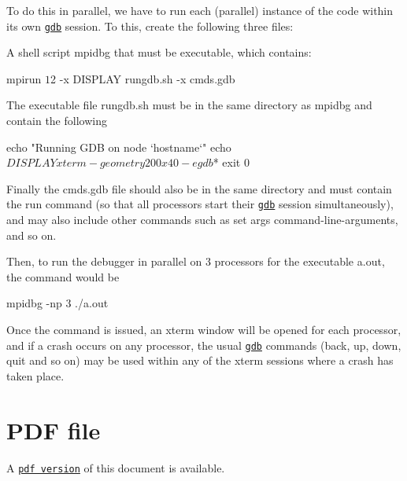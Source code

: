 To do this in parallel, we have to run each (parallel) instance of the code within its own \href{http://www.gnu.org/software/gdb/}{\tt gdb} session. To this, create the following three files\+:
\begin{DoxyItemize}
\item A shell script {\ttfamily mpidbg} that must be executable, which contains\+: 
\begin{DoxyCode}
mpirun $1 $2 -x DISPLAY rungdb.sh -x cmds.gdb
\end{DoxyCode}

\item The executable file {\ttfamily rungdb.\+sh} must be in the same directory as {\ttfamily mpidbg} and contain the following 
\begin{DoxyCode}
echo \textcolor{stringliteral}{"Running GDB on node `hostname`"}
echo $DISPLAY
xterm -geometry 200x40 -e gdb $*
exit 0
\end{DoxyCode}

\item Finally the {\ttfamily cmds.\+gdb} file should also be in the same directory and must contain the {\ttfamily run} command (so that all processors start their \href{http://www.gnu.org/software/gdb/}{\tt gdb} session simultaneously), and may also include other commands such as {\ttfamily set} {\ttfamily args} {\ttfamily command-\/line-\/arguments}, and so on.
\end{DoxyItemize}

Then, to run the debugger in parallel on 3 processors for the executable {\ttfamily a.\+out}, the command would be 
\begin{DoxyCode}
mpidbg -np 3 ./a.out 
\end{DoxyCode}
 Once the command is issued, an {\ttfamily xterm} window will be opened for each processor, and if a crash occurs on any processor, the usual \href{http://www.gnu.org/software/gdb/}{\tt gdb} commands ({\ttfamily back}, {\ttfamily up}, {\ttfamily down}, {\ttfamily quit} and so on) may be used within any of the {\ttfamily xterm} sessions where a crash has taken place.



 

 \hypertarget{index_pdf}{}\section{P\+D\+F file}\label{index_pdf}
A \href{../latex/refman.pdf}{\tt pdf version} of this document is available. 
